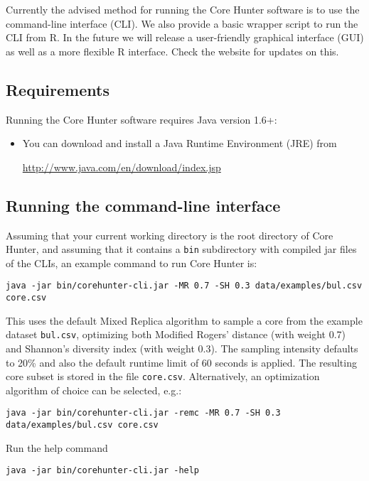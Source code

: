 \documentclass[a4paper, titlepage, 11pt]{article}
\begin{document}
Currently the advised method for running the Core Hunter software is to use the command-line interface (CLI). We also provide a basic wrapper script to run the CLI from R. In the future we will release a user-friendly graphical interface (GUI) as well as a more flexible R interface. Check the website for updates on this.

\subsection{Requirements}

Running the Core Hunter software requires Java version 1.6+:
\begin{itemize}

	\item You can download and install a Java Runtime Environment (JRE) from

	\url{http://www.java.com/en/download/index.jsp}

\end{itemize}

\subsection{Running the command-line interface}
\label{subsect:CLI}

Assuming that your current working directory is the root directory of Core Hunter, and assuming that it contains a \texttt{bin} subdirectory with compiled jar files of the CLIs, an example command to run Core Hunter is:
\small
\begin{verbatim}
java -jar bin/corehunter-cli.jar -MR 0.7 -SH 0.3 data/examples/bul.csv core.csv
\end{verbatim}
\normalsize

This uses the default Mixed Replica algorithm to sample a core from the example dataset \texttt{bul.csv}, optimizing both Modified Rogers' distance (with weight 0.7) and Shannon's diversity index (with weight 0.3). The sampling intensity defaults to 20\% and also the default runtime limit of 60 seconds is applied. The resulting core subset is stored in the file \texttt{core.csv}.
Alternatively, an optimization algorithm of choice can be selected, e.g.:
\small
\begin{verbatim}
java -jar bin/corehunter-cli.jar -remc -MR 0.7 -SH 0.3 data/examples/bul.csv core.csv
\end{verbatim}
\normalsize

Run the help command
\small
\begin{verbatim}
java -jar bin/corehunter-cli.jar -help
\end{verbatim}
\normalsize
\end{document}
